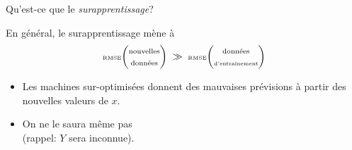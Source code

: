 \begin{frame}{\Large Qu'est-ce que le \textit{surapprentissage}?}
\begin{multicols}{2}
\begin{flushright}
\begin{minipage}{5.0cm}


	\vskip 0.3cm
	\pause\pause\pause\pause
	En g\'en\'eral, {\color{red}le surapprentissage m\`ene \`a
	\vskip -0.5cm
	\begin{equation*}
	\textnormal{\tiny RMSE}\!\left(\!\!\!\begin{array}{c}
		\textnormal{\scriptsize nouvelles} \\ \textnormal{\scriptsize donn\'ees}
		\end{array}\!\!\!\right)
	\;\gg\;
	\textnormal{\tiny RMSE}\!\left(\!\!\!\begin{array}{c}
		\textnormal{\scriptsize donn\'ees} \\ \textnormal{\tiny d'entra\^inement}
		\end{array}\!\!\!\right)
	\end{equation*}
	}

	\begin{itemize}
	\item
		\pause
		Les machines sur-optimis\'ees donnent des mauvaises pr\'evisions
		\`a partir des nouvelles valeurs de $x$.
	\item
		\pause
		On ne le saura m\^{e}me pas\\ (rappel: $Y$ sera inconnue).
	\end{itemize}


\end{minipage}
\end{flushright}
\end{multicols}
\end{frame}
